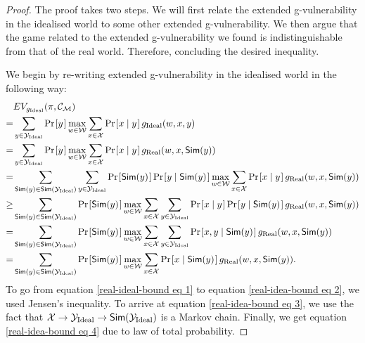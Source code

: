 \begin{proof}
	The proof takes two steps. We will first relate the extended g-vulnerability in the idealised world to some other extended g-vulnerability. We then argue that the game related to the extended g-vulnerability we found is indistinguishable from that of the real world. Therefore, concluding the desired inequality.
	
	We begin by re-writing extended g-vulnerability in the idealised world in the following way:
	\begin{align}
	  &	EV_{g_{\text{Ideal}}}(\pi, \channelM) \\
	= & \sum_{y \in \Y_{\text{Ideal}}} \prob{y} \max_{w \in \W} \sum_{x \in \X} \prob{x \mid y} g_{\text{Ideal}}(w, x, y) \\
	= & \sum_{y \in \Y_{\text{Ideal}}} \prob{y} \max_{w \in \W} \sum_{x \in \X} \prob{x \mid y} g_{\text{Real}}(w, x, \simulator(y)) \\
	= & \sum_{\simulator(y) \in \simulator(\Y_{\text{Ideal}})} \sum_{y \in {\Y_{\text{Ideal}}}} \prob{\simulator(y)} \prob{y \mid \simulator(y)} \max_{w \in \W} \sum_{x \in \X} \prob{x \mid y} g_{\text{Real}}(w, x, \simulator(y)) \label{real-ideal-bound eq 1} \\
	\geq & \sum_{\simulator(y) \in \simulator(\Y_{\text{Ideal}})}  \prob{\simulator(y)} \max_{w \in \W} \sum_{x \in \X} \sum_{y \in {\Y_{\text{Ideal}}}} \prob{x \mid y} \prob{y \mid \simulator(y)} g_{\text{Real}}(w, x, \simulator(y)) \label{real-idea-bound eq 2} \\
	= & \sum_{\simulator(y) \in \simulator(\Y_{\text{Ideal}})}  \prob{\simulator(y)} \max_{w \in \W} \sum_{x \in \X} \sum_{y \in {\Y_{\text{Ideal}}}} \prob{x, y \mid \simulator(y)} g_{\text{Real}}(w, x, \simulator(y)) \label{real-idea-bound eq 3} \\
	= & \sum_{\simulator(y) \in \simulator(\Y_{\text{Ideal}})}  \prob{\simulator(y)} \max_{w \in \W} \sum_{x \in \X} \prob{x \mid \simulator(y)} g_{\text{Real}}(w, x, \simulator(y)). \label{real-idea-bound eq 4}
	\end{align}
	To go from equation \ref{real-ideal-bound eq 1} to equation \ref{real-idea-bound eq 2}, we used Jensen's inequality. To arrive at equation \ref{real-idea-bound eq 3}, we use the fact that $\mathcal{X} \rightarrow \mathcal{Y}_{\text{Ideal}} \rightarrow \mathsf{Sim}(\mathcal{Y}_{\text{Ideal}})$ is a Markov chain. Finally, we get equation \ref{real-idea-bound eq 4} due to law of total probability.
	

\end{proof}
